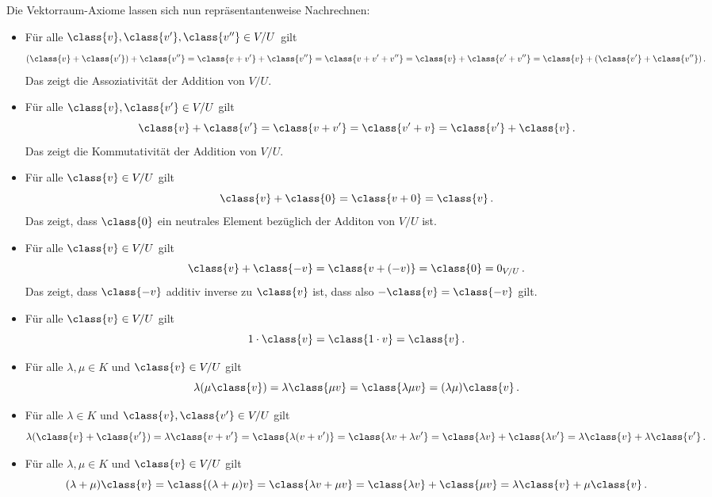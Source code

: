 Die Vektorraum-Axiome lassen sich nun repräsentantenweise Nachrechnen:

\begin{itemize}
  \item
    Für alle $\class{v}, \class{v'}, \class{v''} \in V\!/U$ gilt
    \[
        (\class{v} + \class{v'}) + \class{v''}
      = \class{v + v'} + \class{v''}
      = \class{v + v' + v''}
      = \class{v} + \class{v' + v''}
      = \class{v} + (\class{v'} + \class{v''}) \,.
    \]
    Das zeigt die Assoziativität der Addition von $V\!/U$.
  \item
    Für alle $\class{v}, \class{v'} \in V\!/U$ gilt
    \[
        \class{v} + \class{v'}
      = \class{v + v'}
      = \class{v' + v}
      = \class{v'} + \class{v} \,.
    \]
    Das zeigt die Kommutativität der Addition von $V\!/U$.
  \item
    Für alle $\class{v} \in V\!/U$ gilt
    \[
        \class{v} + \class{0}
      = \class{v + 0}
      = \class{v} \,.
    \]
    Das zeigt, dass $\class{0}$ ein neutrales Element bezüglich der Additon von $V\!/U$ ist.
  \item
    Für alle $\class{v} \in V\!/U$ gilt
    \[
        \class{v} + \class{-v}
      = \class{v + (-v)}
      = \class{0}
      = 0_{V\!/U} \,.
    \]
    Das zeigt, dass $\class{-v}$ additiv inverse zu $\class{v}$ ist, dass also $-\class{v} = \class{-v}$ gilt.
  \item
    Für alle $\class{v} \in V\!/U$ gilt
    \[
        1 \cdot \class{v}
      = \class{1 \cdot v}
      = \class{v} \,.
    \]
  \item
    Für alle $\lambda, \mu \in K$ und $\class{v} \in V\!/U$ gilt
    \[
        \lambda (\mu \class{v})
      = \lambda \class{\mu v}
      = \class{\lambda \mu v}
      = (\lambda \mu) \class{v} \,.
    \]
  \item
    Für alle $\lambda \in K$ und $\class{v}, \class{v'} \in V\!/U$ gilt
    \[
        \lambda (\class{v} + \class{v'})
      = \lambda \class{v + v'}
      = \class{\lambda (v + v')}
      = \class{\lambda v + \lambda v'}
      = \class{\lambda v} + \class{\lambda v'}
      = \lambda \class{v} + \lambda \class{v'} \,.
    \]
  \item
    Für alle $\lambda, \mu \in K$ und $\class{v} \in V\!/U$ gilt
    \[
        (\lambda + \mu) \class{v}
      = \class{(\lambda + \mu) v}
      = \class{\lambda v + \mu v}
      = \class{\lambda v} + \class{\mu v}
      = \lambda \class{v} + \mu \class{v} \,.
    \]
\end{itemize}





